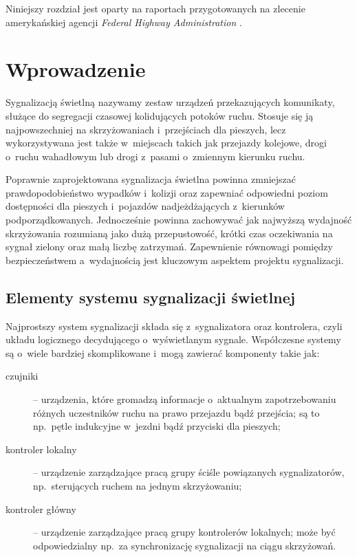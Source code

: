 \documentclass{pracamgr}
\theoremstyle{plain}
\begin{document}
Niniejszy rozdział jest oparty na raportach przygotowanych na zlecenie
amerykańskiej agencji \emph{Federal Highway Administration}
\cite{fhwa:handbook06} \cite{fhwa:timing08}.

\section{Wprowadzenie}
\label{s:sygn-wprowadzenie}

Sygnalizacją świetlną nazywamy zestaw urządzeń przekazujących
komunikaty, służące do segregacji czasowej kolidujących potoków
ruchu. Stosuje się ją najpowszechniej na skrzyżowaniach i~przejściach
dla pieszych, lecz wykorzystywana jest także w~miejscach takich jak
przejazdy kolejowe, drogi o~ruchu wahadłowym lub drogi z~pasami
o~zmiennym kierunku ruchu.

Poprawnie zaprojektowana sygnalizacja świetlna powinna zmniejszać
prawdopodobieństwo wypadków i~kolizji oraz zapewniać odpowiedni poziom
dostępności dla pieszych i~pojazdów nadjeżdżających z~kierunków
podporządkowanych. Jednocześnie powinna zachowywać jak najwyższą
wydajność skrzyżowania rozumianą jako dużą przepustowość, krótki
czas oczekiwania na sygnał zielony oraz małą liczbę
zatrzymań. Zapewnienie równowagi pomiędzy bezpieczeństwem a~wydajnością
jest kluczowym aspektem projektu sygnalizacji.

\subsection{Elementy systemu sygnalizacji świetlnej}
\label{ss:elementy} Najprostszy system sygnalizacji składa się
z~sygnalizatora oraz kontrolera, czyli układu logicznego decydującego
o~wyświetlanym sygnale. Współczesne systemy są o~wiele bardziej
skomplikowane i~mogą zawierać komponenty takie jak:
\begin{description}
  \item[czujniki] -- urządzenia, które gromadzą informacje o~aktualnym
  zapotrzebowaniu różnych uczestników ruchu na prawo przejazdu bądź
  przejścia; są to np.~pętle indukcyjne w~jezdni bądź przyciski dla
  pieszych;
  \item[kontroler lokalny] -- urządzenie zarządzające pracą grupy
  ściśle powiązanych sygnalizatorów, np.~sterujących ruchem na jednym
  skrzyżowaniu;
  \item[kontroler główny] -- urządzenie zarządzające pracą grupy
  kontrolerów lokalnych; może być odpowiedzialny np.~za synchronizację
  sygnalizacji na ciągu skrzyżowań.
\end{description}
\end{document}
